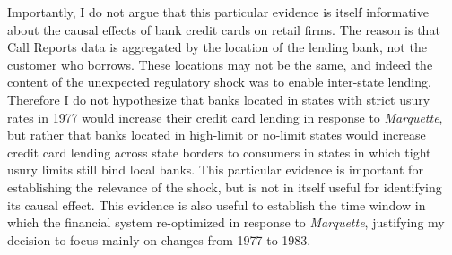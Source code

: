 \documentclass[12pt,english]{article}
\begin{document}
Importantly, I do not argue that this particular evidence is itself informative about the causal effects of bank credit cards on retail firms. The reason is that Call Reports data is aggregated by the location of the lending bank, not the customer who borrows. These locations may not be the same, and indeed the content of the unexpected regulatory shock was to enable inter-state lending. Therefore I do not hypothesize that banks located in states with strict usury rates in 1977 would increase their credit card lending in response to \emph{Marquette}, but rather that banks located in high-limit or no-limit states would increase credit card lending across state borders to consumers in states in which tight usury limits still bind local banks. This particular evidence is important for establishing the relevance of the shock, but is not in itself useful for identifying its causal effect. This evidence is also useful to establish the time window in which the financial system re-optimized in response to \emph{Marquette}, justifying my decision to focus mainly on changes from 1977 to 1983. 
\end{document}
